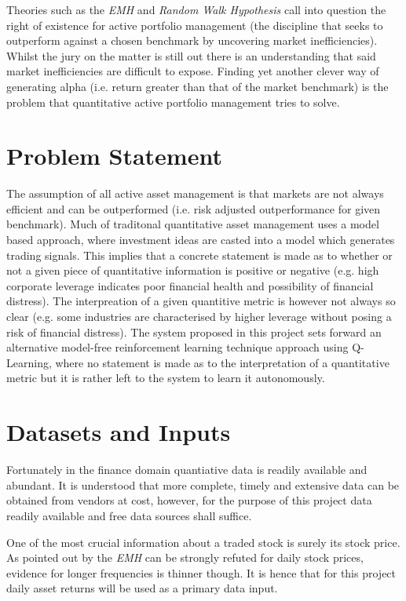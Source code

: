 \documentclass[dvips,12pt]{article}
\begin{document}
Theories such as the \emph{EMH} and \emph{Random Walk Hypothesis}\cite{cootner1964} call into question the right of existence for active portfolio management (the discipline that seeks to outperform against a chosen benchmark by uncovering market inefficiencies). Whilst the jury on the matter is still out there is an understanding that said market inefficiencies are difficult to expose\cite{grinoldkahn1999}. Finding yet another clever way of generating alpha (i.e. return greater than that of the market benchmark) is the problem that quantitative active portfolio management tries to solve.


\section{Problem Statement}
The assumption of all active asset management is that markets are not always efficient and can be outperformed (i.e. risk adjusted outperformance for given benchmark). Much of traditonal quantitative asset management uses a model based approach, where investment ideas are casted into a model which generates trading signals\cite{grinoldkahn1999}. This implies that a concrete statement is made as to whether or not a given piece of quantitative information is positive or negative (e.g. high corporate leverage indicates poor financial health and possibility of financial distress). The interpreation of a given quantitive metric is however not always so clear (e.g. some industries are characterised by higher leverage without posing a risk of financial distress). The system proposed in this project sets forward an alternative model-free reinforcement learning technique approach using Q-Learning, where no statement is made as to the interpretation of a quantitative metric but it is rather left to the system to learn it autonomously.

\section{Datasets and Inputs}
Fortunately in the finance domain quantiative data is readily available and abundant. It is understood that more complete, timely and extensive data can be obtained from vendors at cost, however, for the purpose of this project data readily available and free data sources shall suffice.

One of the most crucial information about a traded stock is surely its stock price. As pointed out by \cite{sewell2012} the \emph{EMH} can be strongly refuted for daily stock prices, evidence for longer frequencies is thinner though. It is hence that for this project daily asset returns will be used as a primary data input.
\end{document}
